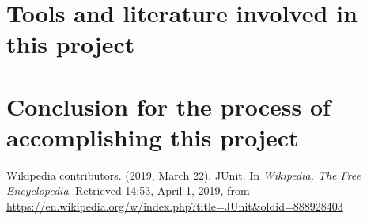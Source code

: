 \documentclass[a4paper]{report}
\begin{document}
\chapter{Tools and literature involved in this project}



\chapter{Conclusion for the process of accomplishing this project}


\begin{thebibliography}{A}


Wikipedia contributors. (2019, March 22). JUnit. In \emph{Wikipedia, The Free Encyclopedia}. Retrieved 14:53, April 1, 2019, from \url{https://en.wikipedia.org/w/index.php?title=JUnit&oldid=888928403}

\end{thebibliography}
\end{document}
